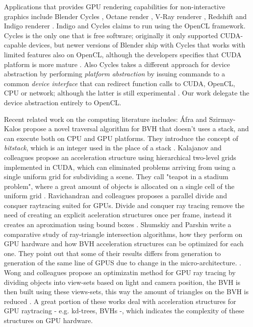 \documentclass[a4paper]{sbgames}               %
\begin{document}
Applications that provides GPU rendering capabilities for
non-interactive graphics include Blender Cycles\cite{Cycles} , Octane
render \cite{Octane}, V-Ray renderer \cite{VRAY}, Redshift
\cite{Redshift} and Indigo renderer \cite{Indigo}. Indigo and Cycles
claims to run using the OpenCL framework. Cycles is the only one that
is free software; originally it only supported CUDA-capable devices,
but newer versions of Blender ship with Cycles that works with limited
features also on OpenCL, although the developers specifies that CUDA
platform is more mature \cite{Cycles}.  Also Cycles takes a different
approach for device abstraction by performing \emph{platform
  abstraction} by issuing commands to a common \emph{device interface}
that can redirect function calls to CUDA, OpenCL, CPU or network;
although the latter is still experimental \cite{CyclesDevel}. Our work
delegate the device abstraction entirely to OpenCL.

Recent related work on the computing literature includes: Áfra and
Szirmay-Kalos propose a novel traversal algorithm for BVH that doesn't
uses a stack, and can execute both on CPU and GPU platforms. They
introduce the concept of \emph{bitstack}, which is an integer used in
the place of a stack \cite{Afra}. Kalajanov and colleagues propose an
acceleration structure using hierarchical two-level grids implemented
in CUDA, which can eliminated problems arriving from using a single
uniform grid for subdividing a scene. They call "teapot in a stadium
problem", where a great amount of objects is allocated on a single
cell of the uniform grid \cite{Kalojanov}. Ravichandran and colleagues
proposes a parallel divide and conquer raytracing suited for
GPUs. Divide and conquer ray tracing remove the need of creating an
explicit aceleration structures once per frame, instead it creates an
aproximation using bound boxes \cite{Ravichandran}. Shumskiy and
Parshin write a comparative study of ray-triangle intersection
algorithms, how they perform on GPU hardware and how BVH acceleration
structures can be optimized for each one. They point out that some of
their results differs from generation to generation of the same line
of GPUS due to change in the micro-architecture.
\cite{Shumskiy}. Wong and colleagues propose an optimizatin method for
GPU ray tracing by dividing objects into view-sets based on light and
camera position, the BVH is then built using these views-sets, this
way the amount of triangles on the BVH is reduced \cite{Wong}. A great
portion of these works deal with acceleration structures for GPU
raytracing - e.g. kd-trees, BVHs -, which indicates the complexity of
these structures on GPU hardware.
\end{document}
